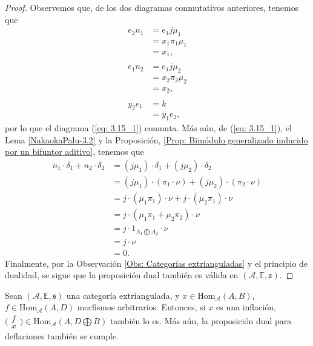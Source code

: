 \documentclass[tesis]{subfiles}
\begin{document}
\begin{proof}
    Observemos que, de los dos diagramas conmutativos anteriores, tenemos que
    \begin{align*}
        e_2n_1 &= e_1j\mu_1 \\
               &= x_1\pi_1\mu_1 \\
               &= x_1, \\ \\
        e_1n_2 &= e_1j\mu_2 \\
               &= x_2\pi_2\mu_2 \\
               &= x_2, \\ \\
        y_2e_1 &= k \\
               &= y_1e_2,
    \end{align*}
    por lo que el diagrama (\ref{eq: 3.15_1}) conmuta. Más aún, de (\ref{eq: 3.15_1}), el Lema \ref{NakaokaPalu-3.2} y la Proposición, \ref{Prop: Bimódulo generalizado inducido por un bifuntor aditivo}, tenemos que
    \begin{align*}
        n_1\cdot\delta_1 + n_2\cdot\delta_2 &= (j\mu_1)\cdot\delta_1 + (j\mu_2)\cdot\delta_2 \\
                                            &= (j\mu_1)\cdot(\pi_1\cdot\nu) + (j\mu_2)\cdot(\pi_2\cdot\nu) \\ 
                                            &= j\cdot(\mu_1\pi_1)\cdot\nu + j\cdot(\mu_2\pi_1)\cdot\nu \\
                                            &= j\cdot(\mu_1\pi_1+\mu_2\pi_2)\cdot\nu \\
                                            &= j\cdot 1_{A_1\bigoplus A_2} \cdot\nu \\
                                            &= j\cdot\nu \\
                                            &= 0.
    \end{align*}
    Finalmente, por la Observación \ref{Obs: Categorías extrianguladas} y el principio de dualidad, se sigue que la proposición dual también es válida en $(\mathscr{A},\mathbb{E},\mathfrak{s})$.
\end{proof}

\begin{Coro}\cite[Corollary 3.16]{NakaokaPalu}\label{NakaokaPalu-3.16}
    Sean $(\mathscr{A},\mathbb{E},\mathfrak{s})$ una categoría extriangulada, y $x\in\text{Hom}_\mathscr{A}(A,B)$, $f\in\text{Hom}_\mathscr{A}(A,D)$ morfismos arbitrarios. Entonces, si $x$ es una inflación, $\big( \begin{smallmatrix} f \\ x \end{smallmatrix} \big) \in\text{Hom}_\mathscr{A}(A,D\bigoplus B)$ también lo es. Más aún, la proposición dual para deflaciones también se cumple.
\end{Coro}
\end{document}
